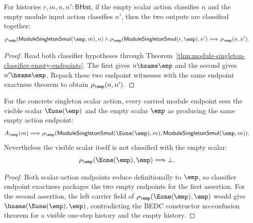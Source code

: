 \begin{theorem}
\label{thm:module-singleton-smul-empty-action-outputs-deterministic}
For histories $r,m,n,n':\mathsf{BHist}$, if the empty scalar action classifies
$n$ and the empty module input action classifies $n'$, then the two outputs are
classified together:
$$
\rho_{\emp}(\mathsf{ModuleSingletonSmul}(\emp,m),n)
\wedge
\rho_{\emp}(\mathsf{ModuleSingletonSmul}(r,\emp),n')
\Longrightarrow
\rho_{\emp}(n,n').
$$
\end{theorem}
\begin{proof}
Read both classifier hypotheses through
Theorem~\ref{thm:module-singleton-classifier-empty-endpoints}. The first gives
$n\hsame\emp$ and the second gives $n'\hsame\emp$. Repack these two endpoint
witnesses with the same endpoint exactness theorem to obtain
$\rho_{\emp}(n,n')$.
\end{proof}

\begin{theorem}
\label{thm:module-singleton-smul-nonfaithful-visible-scalar}
For the concrete singleton scalar action, every carried module endpoint sees
the visible scalar $\Eone(\emp)$ and the empty scalar $\emp$ as producing the
same empty action endpoint:
$$
A_{\emp}(m)\Longrightarrow
\rho_{\emp}(\mathsf{ModuleSingletonSmul}(\Eone(\emp),m),
\mathsf{ModuleSingletonSmul}(\emp,m)).
$$
Nevertheless the visible scalar itself is not classified with the empty scalar:
$$
\rho_{\emp}(\Eone(\emp),\emp)\Longrightarrow\bot.
$$
\end{theorem}
\begin{proof}
Both scalar-action endpoints reduce definitionally to $\emp$, so classifier
endpoint exactness packages the two empty endpoints for the first assertion.
For the second assertion, the left carrier field of
$\rho_{\emp}(\Eone(\emp),\emp)$ would give
$\hsame(\Eone(\emp),\emp)$, contradicting the BEDC constructor
no-confusion theorem for a visible one-step history and the empty history.
\end{proof}

